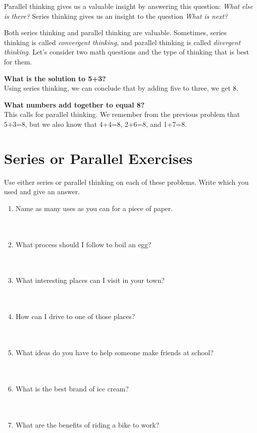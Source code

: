Parallel thinking gives us a valuable insight by answering this question: \textit{What else is there?} Series thinking gives us an insight to the question \textit{What is next?}

Both series thinking and parallel thinking are valuable. Sometimes, series thinking is called \textit{convergent thinking}, and parallel thinking is called \textit{divergent thinking}. Let's consider two math questions and the type of thinking that is best for them.

\textbf{What is the solution to 5+3?} \\
Using series thinking, we can conclude that by adding five to three, we get 8.

\textbf{What numbers add together to equal 8?} \\
This calls for parallel thinking. We remember from the previous problem that 5+3=8, but we also know that 4+4=8, 2+6=8, and 1+7=8.

\section*{Series or Parallel Exercises}

Use either series or parallel thinking on each of these problems. Write which you used and give an answer.

\begin{enumerate}
	\item Name as many uses as you can for a piece of paper. \\~\\~\\
	\item What process should I follow to boil an egg? \\~\\~\\
	\item What interesting places can I visit in your town? \\~\\~\\
	\item How can I drive to one of those places? \\~\\~\\
	\item What ideas do you have to help someone make friends at school? \\~\\~\\
	\item What is the best brand of ice cream? \\~\\~\\
	\item What are the benefits of riding a bike to work?
\end{enumerate}


